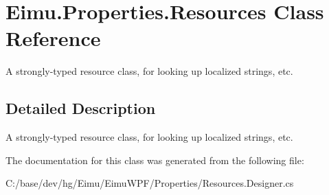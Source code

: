 \hypertarget{class_eimu_1_1_properties_1_1_resources}{
\section{Eimu.Properties.Resources Class Reference}
\label{class_eimu_1_1_properties_1_1_resources}
}


A strongly-\/typed resource class, for looking up localized strings, etc.  




\subsection{Detailed Description}
A strongly-\/typed resource class, for looking up localized strings, etc. 

The documentation for this class was generated from the following file:\begin{DoxyCompactItemize}
\item 
C:/base/dev/hg/Eimu/EimuWPF/Properties/Resources.Designer.cs\end{DoxyCompactItemize}
